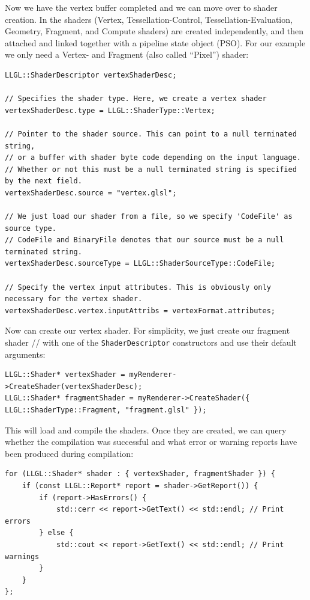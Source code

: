 \documentclass{article}
\begin{document}
Now we have the vertex buffer completed and we can move over to shader creation.
In \LLGL the shaders (Vertex, Tessellation-Control, Tessellation-Evaluation, Geometry, Fragment, and Compute shaders)
are created independently, and then attached and linked together with a pipeline state object (PSO).
For our example we only need a Vertex- and Fragment (also called ``Pixel'') shader:
\begin{lstlisting}
LLGL::ShaderDescriptor vertexShaderDesc;

// Specifies the shader type. Here, we create a vertex shader
vertexShaderDesc.type = LLGL::ShaderType::Vertex;

// Pointer to the shader source. This can point to a null terminated string,
// or a buffer with shader byte code depending on the input language.
// Whether or not this must be a null terminated string is specified by the next field.
vertexShaderDesc.source = "vertex.glsl";

// We just load our shader from a file, so we specify 'CodeFile' as source type.
// CodeFile and BinaryFile denotes that our source must be a null terminated string.
vertexShaderDesc.sourceType	= LLGL::ShaderSourceType::CodeFile;

// Specify the vertex input attributes. This is obviously only necessary for the vertex shader.
vertexShaderDesc.vertex.inputAttribs = vertexFormat.attributes;
\end{lstlisting}
Now can create our vertex shader. For simplicity, we just create our fragment shader
// with one of the \texttt{ShaderDescriptor} constructors and use their default arguments:
\begin{lstlisting}
LLGL::Shader* vertexShader = myRenderer->CreateShader(vertexShaderDesc);
LLGL::Shader* fragmentShader = myRenderer->CreateShader({ LLGL::ShaderType::Fragment, "fragment.glsl" });
\end{lstlisting}
This will load and compile the shaders. Once they are created, we can query whether the compilation was successful
and what error or warning reports have been produced during compilation:
\begin{lstlisting}
for (LLGL::Shader* shader : { vertexShader, fragmentShader }) {
    if (const LLGL::Report* report = shader->GetReport()) {
        if (report->HasErrors() {
            std::cerr << report->GetText() << std::endl; // Print errors
        } else {
            std::cout << report->GetText() << std::endl; // Print warnings
        }
    }
};
\end{lstlisting}
\end{document}

